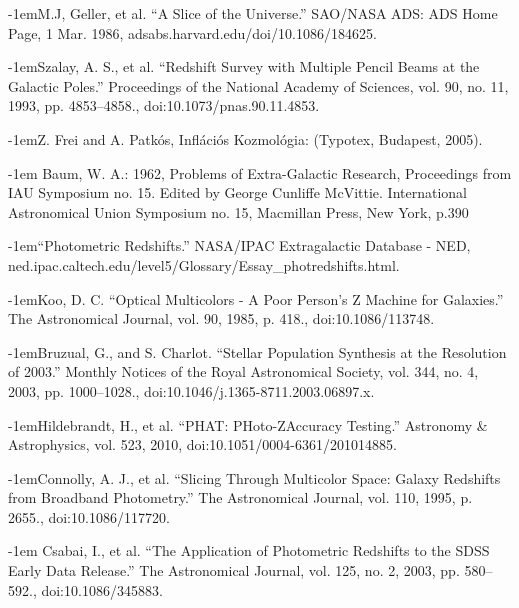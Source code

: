 \documentclass[12pt,letterpaper,oneside,openright]{book}
\begin{document}
\newpage
\begin{thebibliography}{99\kern\bibindent}
\def\bibindent{1em}

\makeatletter
\let\old@biblabel\@biblabel
\def\@biblabel#1{\old@biblabel{#1}\kern\bibindent}
\let\old@bibitem\bibitem
\def\bibitem#1{\old@bibitem{#1}\leavevmode\kern-\bibindent}
\makeatother
{}
M.J, Geller, et al. “A Slice of the Universe.” SAO/NASA ADS: ADS Home Page, 1 Mar. 1986, adsabs.harvard.edu/doi/10.1086/184625.

Szalay, A. S., et al. “Redshift Survey with Multiple Pencil Beams at the Galactic Poles.” Proceedings of the National Academy of Sciences, vol. 90, no. 11, 1993, pp. 4853–4858., doi:10.1073/pnas.90.11.4853.

Z. Frei and A. Patkós, Inflációs Kozmológia: (Typotex, Budapest, 2005).



 Baum, W. A.: 1962, Problems of Extra-Galactic Research, Proceedings from IAU Symposium no. 15. Edited by George Cunliffe McVittie. International Astronomical Union Symposium no. 15, Macmillan Press, New York, p.390


“Photometric Redshifts.” NASA/IPAC Extragalactic Database - NED, ned.ipac.caltech.edu/level5/Glossary/Essay\_{}photredshifts.html.


Koo, D. C. “Optical Multicolors - A Poor Person's Z Machine for Galaxies.” The Astronomical Journal, vol. 90, 1985, p. 418., doi:10.1086/113748.

Bruzual, G., and S. Charlot. “Stellar Population Synthesis at the Resolution of 2003.” Monthly Notices of the Royal Astronomical Society, vol. 344, no. 4, 2003, pp. 1000–1028., doi:10.1046/j.1365-8711.2003.06897.x.


Hildebrandt, H., et al. “PHAT: PHoto-ZAccuracy Testing.” Astronomy \&{} Astrophysics, vol. 523, 2010, doi:10.1051/0004-6361/201014885.



Connolly, A. J., et al. “Slicing Through Multicolor Space: Galaxy Redshifts from Broadband Photometry.” The Astronomical Journal, vol. 110, 1995, p. 2655., doi:10.1086/117720.

 Csabai, I., et al. “The Application of Photometric Redshifts to the SDSS Early Data Release.” The Astronomical Journal, vol. 125, no. 2, 2003, pp. 580–592., doi:10.1086/345883.


\end{thebibliography}
\end{document}
